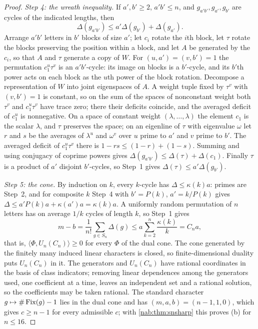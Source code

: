\begin{proof}
\emph{Step 4: the wreath inequality.} If $a',b'\ge2$, $a'b'\le n$, and $g_{a'b'},g_{a'},g_{b'}$
are cycles of the indicated lengths, then
\[
 \Delta(g_{a'b'})\le a'\Delta(g_{b'})+\Delta(g_{a'}) .
\]
Arrange $a'b'$ letters in $b'$ blocks of size $a'$; let $c_i$ rotate the $i$th block, let
$\tau$ rotate the blocks preserving the position within a block, and let $A$ be generated
by the $c_i$, so that $A$ and $\tau$ generate a copy of $W$. For $(u,a')=(v,b')=1$ the
permutation $c_1^u\tau^v$ is an $a'b'$-cycle: its image on blocks is a $b'$-cycle, and its
$b'$th power acts on each block as the $u$th power of the block rotation. Decompose a
representation of $W$ into joint eigenspaces of $A$. A weight tuple fixed by $\tau^v$ with
$(v,b')=1$ is constant, so on the sum of the spaces of nonconstant weight both $\tau^v$ and
$c_1^u\tau^v$ have trace zero; there their deficits coincide, and the averaged deficit of
$c_1^u$ is nonnegative. On a space of constant weight $(\lambda,\dots,\lambda)$ the element
$c_1$ is the scalar $\lambda$, and $\tau$ preserves the space; on an eigenline of $\tau$ with
eigenvalue $\omega$ let $r$ and $s$ be the averages of $\lambda^u$ and $\omega^v$ over $u$
prime to $a'$ and $v$ prime to $b'$. The averaged deficit of $c_1^u\tau^v$ there is
$1-rs\le(1-r)+(1-s)$. Summing and using conjugacy of coprime powers gives
$\Delta(g_{a'b'})\le\Delta(\tau)+\Delta(c_1)$. Finally $\tau$ is a product of $a'$ disjoint
$b'$-cycles, so Step~1 gives $\Delta(\tau)\le a'\Delta(g_{b'})$.

\emph{Step 5: the cone.} By induction on $k$, every $k$-cycle has $\Delta\le\kappa(k)a$: primes
are Step~2, and for composite $k$ Step~4 with $b'=P(k)$, $a'=k/P(k)$ gives
$\Delta\le a'P(k)a+\kappa(a')a=\kappa(k)a$. A uniformly random permutation of $n$ letters has
on average $1/k$ cycles of length $k$, so Step~1 gives
\[
 m-b=\frac1{n!}\sum_{g\in S_n}\Delta(g)\le a\sum_{k=2}^n\frac{\kappa(k)}k=C_na,
\]
that is, $\langle\Phi,U_n(C_n)\rangle\ge0$ for every $\Phi$ of the dual cone. The cone generated
by the finitely many induced linear characters is closed, so finite-dimensional duality puts
$U_n(C_n)$ in it. The generators and $U_n(C_n)$ have rational coordinates in the basis of
class indicators; removing linear dependences among the generators used, one coefficient at
a time, leaves an independent set and a rational solution, so the coefficients may be taken
rational. The standard character $g\mapsto\#\operatorname{Fix}(g)-1$ lies in the dual cone and has
$(m,a,b)=(n-1,1,0)$, which gives $c\ge n-1$ for every admissible $c$; with
\cref{nab:thm:snsharp} this proves (b) for $n\le16$.


\end{proof}
